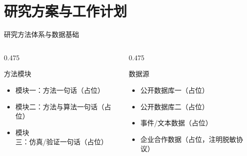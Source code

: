 \documentclass[aspectratio=169,11pt]{beamer}
\begin{document}
\section{研究方案与工作计划}

\begin{frame}{研究方法体系与数据基础}
  \footnotesize
  \begin{columns}[T]
    \begin{column}{0.475\textwidth}
      \begin{dmucard}{方法模块}
        \begin{itemize}
          \item \textcolor{dmuhead}{模块一}：方法一句话（占位）
          \item \textcolor{dmuhead}{模块二}：方法与算法一句话（占位）
          \item \textcolor{dmuhead}{模块三}：仿真/验证一句话（占位）
        \end{itemize}
      \end{dmucard}
    \end{column}
    \begin{column}{0.475\textwidth}
      \begin{dmucard}{数据源}
        \begin{itemize}
          \item 公开数据库一（占位）
          \item 公开数据库二（占位）
          \item 事件/文本数据（占位）
          \item 企业合作数据（占位，注明脱敏协议）
        \end{itemize}
      \end{dmucard}
    \end{column}
  \end{columns}
\end{frame}
\end{document}
